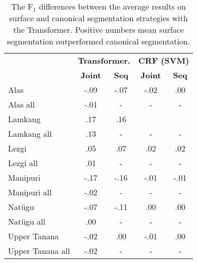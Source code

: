 \begin{table}[!tb]
    \centering
    \begin{tabular}{l|c|c|c|c}
          & \multicolumn{2}{c|}{\textbf{Transformer.}} & \multicolumn{2}{c}{\textbf{CRF (SVM)}} \\
          & \textbf{Joint} & \textbf{Seq} & \textbf{Joint} & \textbf{Seq} \\
         \hline
         Alas  & -.09 &  -.07 & -.02 & .00 \\
         Alas all & -.01 & - & - & - \\
         \hline
         Lamkang  & .17 & .16 &  &  \\
         Lamkang all & .13 & - & - & - \\
         \hline
         Lezgi  & .05 & .07 & .02 & .02 \\
         Lezgi all & .01 & - & - & - \\
         \hline
         Manipuri  & -.17 & -.16 & -.01 & -.01 \\
         Manipuri all & -.02 & - & - & - \\
         \hline
         Natügu  & -.07 & -.11 & .00 & .00 \\
         Natügu all & .00 & - & - & - \\
         \hline
         Upper Tanana & -.02 & .00 & -.01 & .00 \\
         Upper Tanana all & -.02 & - & - & - \\
    \end{tabular}
    \caption[F$_1$-score Differences between Surface and Canonical Segmentation]{The F$_1$ differences between the average results on surface and canonical segmentation strategies with the Transformer. Positive numbers mean surface segmentation outperformed canonical segmentation.}
    \label{tab:segdiffresults}
\end{table}


